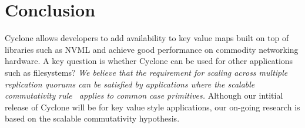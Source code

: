 \documentclass[10pt, preprint, nonatbib]{sigplanconf}
\begin{document}
\section{Conclusion}
Cyclone allows developers to add availability to key value maps built on top of
libraries such as NVML and achieve good performance on commodity networking
hardware. A key question is whether Cyclone can be used for other applications
such as filesystems? \emph{We believe that the requirement for scaling across
  multiple replication quorums can be satisfied by applications where the
  scalable commutativity rule~\cite{scalable_commutativity} applies to common
  case primitives.} Although our intitial release of Cyclone will be for key
value style applications, our on-going research is based on the scalable
commutativity hypothesis.
\newcommand\myurl[2]{\url{#1}}


\end{document}
